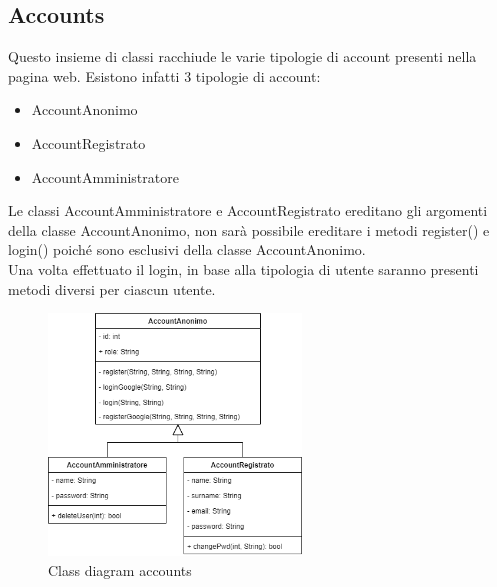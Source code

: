 \documentclass[a4paper,12pt]{article}
\begin{document}
\subsection{Accounts}
Questo insieme di classi racchiude le varie tipologie di account presenti nella pagina web. Esistono infatti 3 tipologie di account:
\begin{itemize}
    \item AccountAnonimo
    \item AccountRegistrato
    \item AccountAmministratore
\end{itemize} 
Le classi AccountAmministratore e AccountRegistrato ereditano gli argomenti della classe AccountAnonimo, non sarà possibile ereditare i metodi register() e login() poiché sono esclusivi della classe AccountAnonimo.\\
Una volta effettuato il login, in base alla tipologia di utente saranno presenti metodi diversi per ciascun utente.
\begin{figure}[H]
   \centering
    \includegraphics[width=0.6\textwidth]{D3/img/class_diagram_accounts.png}
    \caption{Class diagram accounts}
\end{figure}

\newpage
\end{document}
